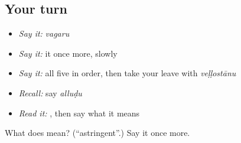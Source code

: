 \subsection*{Your turn}
\begin{itemize}
\raggedright
  \item \emph{Say it:} \emph{vagaru}
  \item \emph{Say it:} it once more, slowly
  \item \emph{Say it:} all five in order, then take your leave with \emph{veḷḷostānu}
  \item \emph{Recall:} say \emph{alluḍu}
  \item \emph{Read it:} \textbf{}, then say what it means
\end{itemize}

\begin{tcolorbox}[breakable,colback=teal!4,colframe=teal!35!black,title={Before you move on}]
What does  mean? (\textquotedblleft{}astringent\textquotedblright{}.) Say it once more.
\end{tcolorbox}
